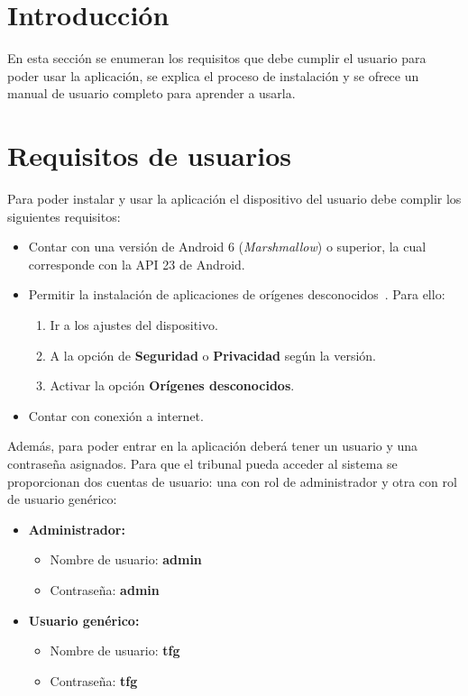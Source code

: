 
\section{Introducción}

En esta sección se enumeran los requisitos que debe cumplir el usuario para poder usar la aplicación, se explica el proceso de instalación y se ofrece un manual de usuario completo para aprender a usarla. 

\section{Requisitos de usuarios}

Para poder instalar y usar la aplicación el dispositivo del usuario debe complir los siguientes requisitos: 

\begin{itemize}
	\item Contar con una versión de Android 6 (\textit{Marshmallow}) o superior, la cual corresponde con la API 23 de Android. 
	\item Permitir la instalación de aplicaciones de orígenes desconocidos~\cite{origenesdesconocidos}. Para ello: 
	\begin{enumerate}
		\item Ir a los ajustes del dispositivo. 
		\item A la opción de \textbf{Seguridad} o \textbf{Privacidad} según la versión. 
		\item Activar la opción \textbf{Orígenes desconocidos}. 
	\end{enumerate}
	\item Contar con conexión a internet. 
\end{itemize}

Además, para poder entrar en la aplicación deberá tener un usuario y una contraseña asignados. Para que el tribunal pueda acceder al sistema se proporcionan dos cuentas de usuario: una con rol de administrador y otra con rol de usuario genérico: 
\begin{itemize}
	\item \textbf{Administrador:} 
	\begin{itemize}
		\item Nombre de usuario: \textbf{admin}
		\item Contraseña: \textbf{admin}
	\end{itemize}
	\item \textbf{Usuario genérico:} 
	\begin{itemize}
		\item Nombre de usuario: \textbf{tfg}
		\item Contraseña: \textbf{tfg}
	\end{itemize}
\end{itemize}

